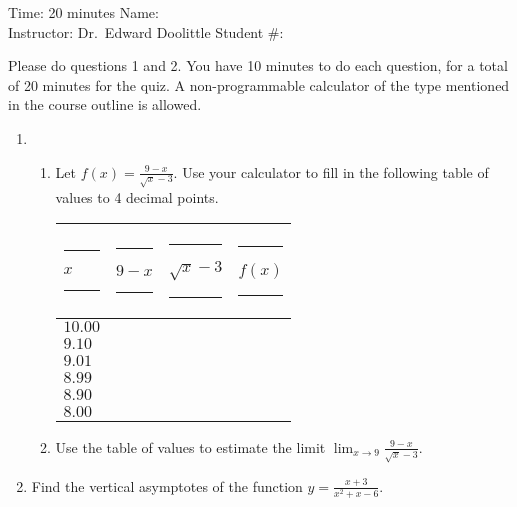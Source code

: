 \documentclass[12pt]{article}
\newcommand{\ds}{\displaystyle}
\begin{document}
\thispagestyle{plain}

\begin{flushleft}
Time:  20 minutes                \hfill       Name: \underline{\hspace{2in}} \\
Instructor: Dr.\ Edward Doolittle \hfill Student \#: \underline{\hspace{2in}}
\end{flushleft}

\noindent
Please do questions 1 and 2.  You have 10 minutes
to do each question, for a total of 20
minutes for the quiz.  A non-programmable
calculator of the type mentioned in the course outline is allowed.

\begin{enumerate}
\item 
  \begin{enumerate}
  \item Let
    $\ds f(x)=\frac{9-x}{\sqrt{x}-3}$.
    Use your calculator to 
    fill in the following table of values to 4 decimal points.
    \begin{center}
      \begin{tabular}{|l|l|l|l|}
        \hline
	\rule{10pt}{0pt}$x$\rule{10pt}{0pt}     
	  & \rule{10pt}{0pt}\rule{0pt}{12pt}$9-x$\rule{10pt}{0pt}
	  & \rule{10pt}{0pt}$\sqrt{x}-3$\rule{10pt}{0pt}
	  & \rule{20pt}{0pt}$f(x)$\rule{20pt}{0pt} \\
	\hline
	\rule{0pt}{12pt}$10.00$ &              &        &        \\
	\hline
	\rule{0pt}{12pt}$9.10$  &              &        &        \\
	\hline
	\rule{0pt}{12pt}$9.01$  &              &        &        \\
	\hline
	\rule{0pt}{12pt}$8.99$  &              &        &        \\
	\hline
	\rule{0pt}{12pt}$8.90$  &              &        &        \\
	\hline
	\rule{0pt}{12pt}$8.00$  &              &        &        \\
	\hline
      \end{tabular}
    \end{center}
  \item Use the table of values to estimate the limit
    $\displaystyle\lim_{x\to 9} \frac{9-x}{\sqrt{x}-3}$.
  \end{enumerate}
\newpage
\item Find the vertical asymptotes of the function
  $\displaystyle y = \frac{x+3}{x^2+x-6}$.
\end{enumerate}
\end{document}
